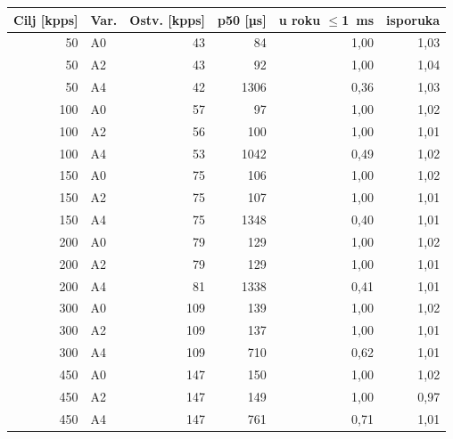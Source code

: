 \begin{tabular}{@{}rlrrrr@{}}
\toprule
Cilj [kpps] & Var. & Ostv. [kpps] & p50 [µs] & u roku $\leq$1~ms & isporuka \\
\midrule
50 & A0 & 43 & 84 & 1{,}00 & 1{,}03 \\
50 & A2 & 43 & 92 & 1{,}00 & 1{,}04 \\
50 & A4 & 42 & 1306 & 0{,}36 & 1{,}03 \\
\midrule
100 & A0 & 57 & 97 & 1{,}00 & 1{,}02 \\
100 & A2 & 56 & 100 & 1{,}00 & 1{,}01 \\
100 & A4 & 53 & 1042 & 0{,}49 & 1{,}02 \\
\midrule
150 & A0 & 75 & 106 & 1{,}00 & 1{,}02 \\
150 & A2 & 75 & 107 & 1{,}00 & 1{,}01 \\
150 & A4 & 75 & 1348 & 0{,}40 & 1{,}01 \\
\midrule
200 & A0 & 79 & 129 & 1{,}00 & 1{,}02 \\
200 & A2 & 79 & 129 & 1{,}00 & 1{,}01 \\
200 & A4 & 81 & 1338 & 0{,}41 & 1{,}01 \\
\midrule
300 & A0 & 109 & 139 & 1{,}00 & 1{,}02 \\
300 & A2 & 109 & 137 & 1{,}00 & 1{,}01 \\
300 & A4 & 109 & 710 & 0{,}62 & 1{,}01 \\
\midrule
450 & A0 & 147 & 150 & 1{,}00 & 1{,}02 \\
450 & A2 & 147 & 149 & 1{,}00 & 0{,}97 \\
450 & A4 & 147 & 761 & 0{,}71 & 1{,}01 \\
\bottomrule
\end{tabular}
